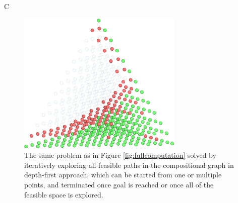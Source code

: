 C

\begin{figure}[h]
    \centering
    \includegraphics[width=0.7\textwidth]{infeasibilitygliding/InfeasibilityGliding_Glide.png}
    \caption{The same problem as in Figure \ref{fig:fullcomputation} solved by iteratively exploring all feasible paths in the compositional graph in depth-first approach, which can be started from one or multiple points, and terminated once goal is reached or once all of the feasible space is explored.}
    \label{fig:glide}
\end{figure}


\printbibliography[heading=subbibintoc]